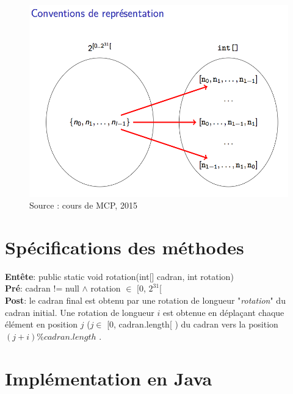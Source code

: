 \documentclass[a4paper, 12pt]{article}
\begin{document}
\begin{figure}[h]
   \includegraphics[scale=0.5]{Conventions.png}
   \caption{Source : cours de MCP, 2015}
\end{figure}

\section{Spécifications des méthodes}

\textbf{Entête}: public static void rotation(int[] cadran, int rotation)\\

\textbf{Pré}: cadran != null $\wedge$ rotation $\in$ [0, $2^{31}$[\\

\textbf{Post}: le cadran final est obtenu par une rotation de longueur "\textit{rotation}" du cadran initial. Une rotation de longueur $i$ est obtenue en déplaçant chaque élément en position $j$ ($j \in$ [0, cadran.length[ ) du cadran vers la position $(j+i)\%cadran.length$ .

\newpage
\section{Implémentation en Java}
\end{document}
